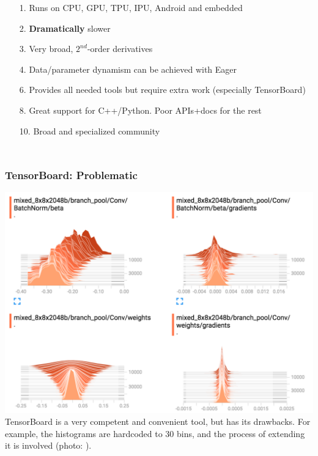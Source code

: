 \documentclass[hyperref={pdfpagelabels=false}]{beamer}
\begin{document}
\begin{frame}
\begin{columns}[t]
\begin{tikzpicture}
         \end{tikzpicture}
         \begin{itemize}
         \item[\scriptsize{\textcolor{visiblered}{1.}}] \scriptsize{Runs on CPU, GPU, TPU, IPU, Android and embedded}
         \item[\scriptsize{\textcolor{visiblered}{2.}}] \scriptsize{\textbf{Dramatically} slower\cite{benchmark-paper17}\cite{u39kun-benchmark}\cite{chainer-benchmarks}}
         \item[\scriptsize{\textcolor{visiblegreen}{3.}}] \scriptsize{Very broad, $2^{nd}$-order derivatives}
         \item[\scriptsize{\textcolor{visiblegreen}{4.}}] \scriptsize{Data/parameter dynamism can be achieved with Eager\cite{tf-eager}}
         \item[\scriptsize{\textcolor{visiblegreen}{6.}}] \scriptsize{Provides all needed tools but require extra work (especially TensorBoard)}
         \item[\scriptsize{\textcolor{visibleblue}{8.}}] \scriptsize{Great support for C++/Python. Poor APIs+docs for the rest}
         \item[\scriptsize{\textcolor{visibleblue}{10.}}] \scriptsize{Broad and specialized community}
         \end{itemize}
          \end{columns}
     \end{frame}


     \begin{frame}
       \frametitle{TensorBoard: Problematic}
       \centering
       \includegraphics[scale=0.21]{tensorboard_hist.png}
       \scriptsize{\\TensorBoard is a very competent and convenient tool, but has its drawbacks. For example, the histograms are hardcoded to 30 bins, and the process of extending it is involved (photo: \cite{tb-photo}).}
     \end{frame}
\end{document}

